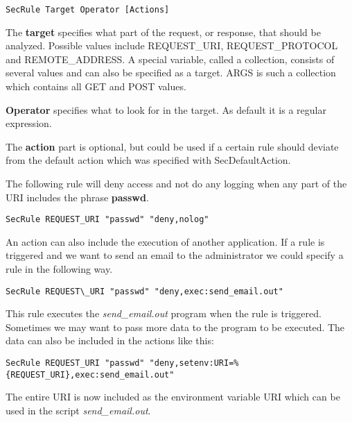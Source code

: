 \documentclass[EITN41]{../tex/cryptosecuritylab}
\begin{document}
\begin{verbatim}SecRule Target Operator [Actions] \end{verbatim} 

The \textbf{target} specifies what part of the request, or response, that should be analyzed. Possible values include REQUEST\_URI, REQUEST\_PROTOCOL and REMOTE\_ADDRESS. A special variable, called a collection, consists of several values and can also be specified as a target. ARGS is such a collection which contains all GET and POST values.

\textbf{Operator} specifies what to look for in the target. As default it is a regular expression.

The \textbf{action} part is optional, but could be used if a certain rule should deviate from the default action which was specified with SecDefaultAction.

The following rule will deny access and not do any logging when any part of the URI includes the phrase \textbf{passwd}.
\begin{verbatim}
SecRule REQUEST_URI "passwd" "deny,nolog"
\end{verbatim}

An action can also include the execution of another application. If a rule is triggered and we want to send an email to the administrator we could specify a rule in the following way.

\begin{verbatim}
SecRule REQUEST\_URI "passwd" "deny,exec:send_email.out"
\end{verbatim}

This rule executes the \textit{send\_email.out} program when the rule is triggered. Sometimes we may want to pass more data to the program to be executed. The data can also be included in the actions like this:

\begin{verbatim}
SecRule REQUEST_URI "passwd" "deny,setenv:URI=%{REQUEST_URI},exec:send_email.out"
\end{verbatim}

The entire URI is now included as the environment variable URI which can be used in the script \textit{send\_email.out}.
\end{document}
